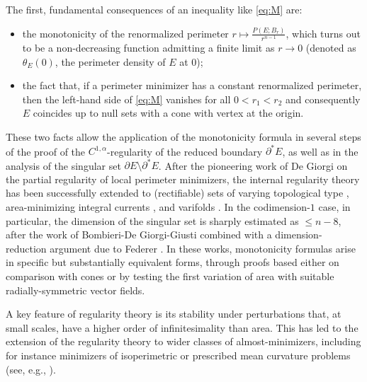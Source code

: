 \documentclass[a4paper,reqno,11pt]{amsart}
\newcommand{\de}{\partial}
\newcommand{\p}{P}
\begin{document}
The first, fundamental consequences of an inequality like \eqref{eq:M} are:
\begin{itemize}
\item[(i)] the monotonicity of the renormalized perimeter $r\mapsto \frac{\p(E;B_{r})}{r^{n-1}}$, which turns out to be a non-decreasing function admitting a finite limit as $r\to 0$ (denoted as $\theta_{E}(0)$, the perimeter density of $E$ at $0$);

\item[(ii)] the fact that, if a perimeter minimizer has a constant renormalized perimeter, then the left-hand side of \eqref{eq:M} vanishes for all $0<r_{1}<r_{2}$ and consequently $E$ coincides up to null sets with a cone with vertex at the origin.
\end{itemize} 

These two facts allow the application of the monotonicity formula in several steps of the proof of the $C^{1,\alpha}$-regularity of the reduced boundary $\de^{*}E$, as well as in the analysis of the singular set $\de E\setminus \de^{*}E$. After the pioneering work of De Giorgi \cite{DeGiorgi1961} on the partial regularity of local perimeter minimizers, the internal regularity theory has been successfully extended to (rectifiable) sets of varying topological type \cite{reifenberg1964analyticity}, area-minimizing integral currents \cite{federer1960normal, almgren2000BigRegPaper, DeLellisSpadaro2014regularity-I,DeLellisSpadaro2016regularity-II,DeLellisSpadaro2016regularity-III}, and varifolds \cite{almgren1968existence,allard1972first}. In the codimension-$1$ case, in particular, the dimension of the singular set is sharply estimated as $\le n-8$, after the work of Bombieri-De Giorgi-Giusti \cite{BombieriDeGiorgiGiusti1969} combined with a dimension-reduction argument due to Federer \cite{simon1984lectures}. In these works, monotonicity formulas arise in specific but substantially equivalent forms, through proofs based either on comparison with cones or by testing the first variation of area with suitable radially-symmetric vector fields. 

A key feature of regularity theory is its stability under perturbations that, at small scales, have a higher order of infinitesimality than area. This has led to the extension of the regularity theory to wider classes of almost-minimizers, including for instance minimizers of isoperimetric or prescribed mean curvature problems (see, e.g., \cite{Massari1974,SchoenSimon1981,Bombieri1982,GonzalezMassariTamanini1983,tamanini1982boundaries}).
\end{document}
